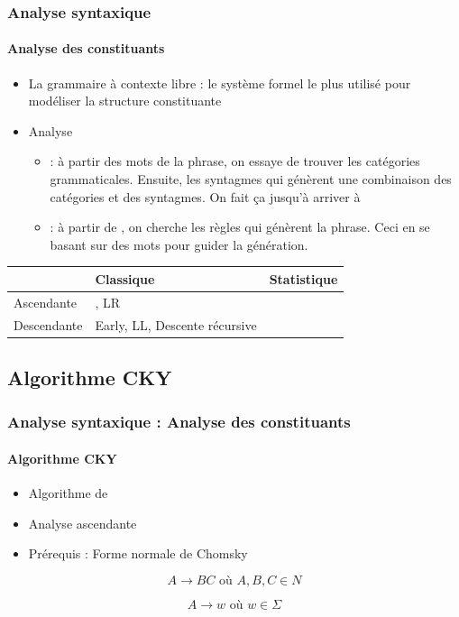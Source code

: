 \documentclass[xcolor=table]{beamer}
\begin{document}
\begin{frame}
\frametitle{Analyse syntaxique}
\framesubtitle{Analyse des constituants}

\begin{itemize}
	\item La grammaire à contexte libre : le système formel le plus utilisé pour modéliser la structure constituante
	\item Analyse 
	\begin{itemize}
		\item {} : à partir des mots de la phrase, on essaye de trouver les catégories grammaticales. Ensuite, les syntagmes qui génèrent une combinaison des catégories et des syntagmes. On fait ça jusqu'à arriver à 
		\item {} : à partir de , on cherche les règles qui génèrent la phrase. Ceci en se basant sur des mots pour guider la génération.
	\end{itemize}
\end{itemize}

\begin{center}
	\begin{tabular}{|p{}|p{}|p{}|}
	\hline
	& Classique & Statistique \\
	\hline
	Ascendante & \optword{CKY}, LR & \optword{CKY probabiliste}\\
	\hline
	Descendante & Early, LL, Descente récursive  & \\
	\hline
\end{tabular}
\end{center}

\end{frame}

\subsection{Algorithme CKY}

\begin{frame}
\frametitle{Analyse syntaxique : Analyse des constituants}
\framesubtitle{Algorithme CKY}

\begin{itemize}
	\item Algorithme de 
	\item Analyse ascendante
	\item Prérequis : Forme normale de Chomsky
\end{itemize}

\begin{definition}
	\[
	A \rightarrow  B C \text{ où } A, B, C \in N
	\]
	
	\[
	A \rightarrow w \text{ où } w \in \Sigma
	\]
\end{definition}

\end{frame}
\end{document}
